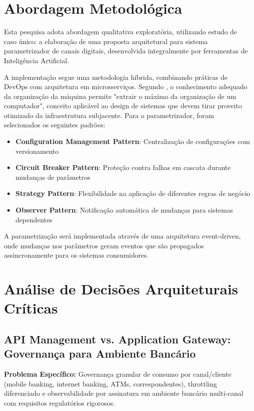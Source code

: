 \section{Abordagem Metodológica}

Esta pesquisa adota abordagem qualitativa exploratória, utilizando estudo de caso único: a elaboração de uma proposta arquitetural para sistema parametrizador de canais digitais, desenvolvida integralmente por ferramentas de Inteligência Artificial.

A implementação segue uma metodologia híbrida, combinando práticas de DevOps  com arquitetura em microsserviços. Segundo , o conhecimento adequado da organização da máquina permite "extrair o máximo da organização de um computador", conceito aplicável ao design de sistemas que devem tirar proveito otimizado da infraestrutura subjacente. Para o parametrizador, foram selecionados os seguintes padrões:

\begin{itemize}
    \item \textbf{Configuration Management Pattern}: Centralização de configurações com versionamento
    \item \textbf{Circuit Breaker Pattern}: Proteção contra falhas em cascata durante mudanças de parâmetros
    \item \textbf{Strategy Pattern}: Flexibilidade na aplicação de diferentes regras de negócio
    \item \textbf{Observer Pattern}: Notificação automática de mudanças para sistemas dependentes
\end{itemize}

A parametrização será implementada através de uma arquitetura event-driven, onde mudanças nos parâmetros geram eventos que são propagados assincronamente para os sistemas consumidores.

\section{Análise de Decisões Arquiteturais Críticas}

\subsection{API Management vs. Application Gateway: Governança para Ambiente Bancário}

\textbf{Problema Específico:} Governança granular de consumo por canal/cliente (mobile banking, internet banking, ATMs, correspondentes), throttling diferenciado e observabilidade por assinatura em ambiente bancário multi-canal com requisitos regulatórios rigorosos.

